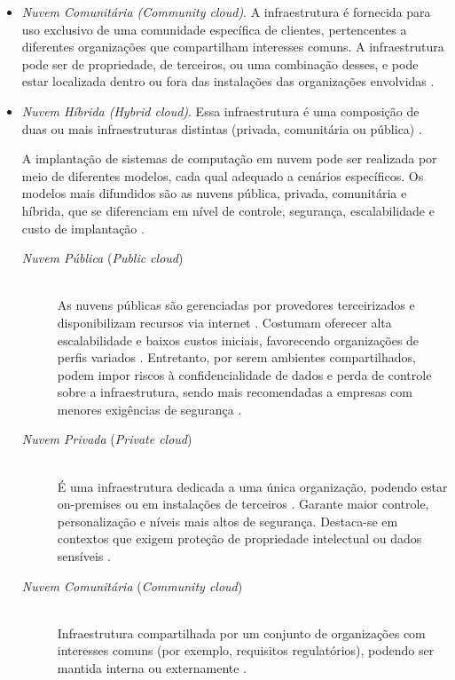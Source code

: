 \begin{itemize}
\item \emph{Nuvem Comunitária (\textit{Community cloud})}. A infraestrutura é fornecida para uso exclusivo de uma comunidade específica de clientes, pertencentes a diferentes organizações que compartilham interesses comuns. A infraestrutura pode ser de propriedade, de terceiros, ou uma combinação desses, e pode estar localizada dentro ou fora das instalações das organizações envolvidas \cite{mell2011}.

\item \emph{Nuvem Híbrida (\textit{Hybrid cloud})}. Essa infraestrutura é uma composição de duas ou mais infraestruturas distintas (privada, comunitária ou pública)  \cite{mell2011}.

A implantação de sistemas de computação em nuvem pode ser realizada por meio de diferentes modelos, cada qual adequado a cenários específicos. Os modelos mais difundidos são as nuvens pública, privada, comunitária e híbrida, que se diferenciam em nível de controle, segurança, escalabilidade e custo de implantação \cite{mell2011}.

\begin{description}
  \item[\emph{Nuvem Pública} (\textit{Public cloud})] \hfill \\ As nuvens públicas são gerenciadas por provedores terceirizados e disponibilizam recursos via internet \cite{carroll2011}. Costumam oferecer alta escalabilidade e baixos custos iniciais, favorecendo organizações de perfis variados \cite{amajuoyi2024}. Entretanto, por serem ambientes compartilhados, podem impor riscos à confidencialidade de dados e perda de controle sobre a infraestrutura, sendo mais recomendadas a empresas com menores exigências de segurança \cite{sathya2023}.

  \item[\emph{Nuvem Privada} (\textit{Private cloud})] \hfill \\ É uma infraestrutura dedicada a uma única organização, podendo estar on-premises ou em instalações de terceiros \cite{mell2011}. Garante maior controle, personalização e níveis mais altos de segurança. Destaca-se em contextos que exigem proteção de propriedade intelectual ou dados sensíveis \cite{swapna2023}.

  \item[\emph{Nuvem Comunitária} (\textit{Community cloud})] \hfill \\ Infraestrutura compartilhada por um conjunto de organizações com interesses comuns (por exemplo, requisitos regulatórios), podendo ser mantida interna ou externamente \cite{mell2011}.


\end{description}
\end{itemize}
